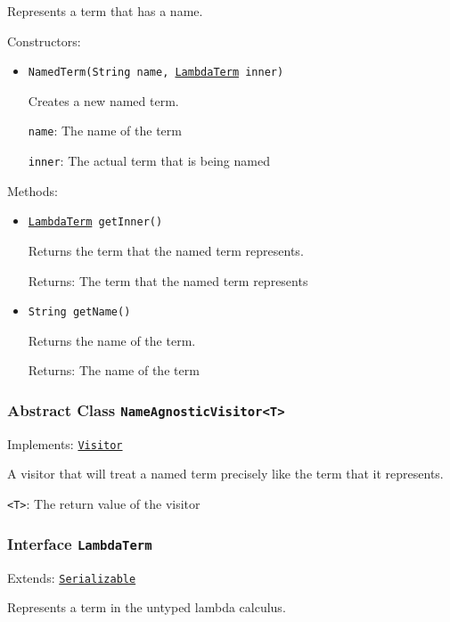 Represents a term that has a name.

Constructors:
\begin{itemize}
\item \texttt{NamedTerm(String name, \hyperref[type:edu.kit.wavelength.client.model.term.LambdaTerm]{LambdaTerm} inner)}

Creates a new named term.

\texttt{name}: The name of the term

\texttt{inner}: The actual term that is being named

\end{itemize}

Methods:
\begin{itemize}
\item \texttt{\hyperref[type:edu.kit.wavelength.client.model.term.LambdaTerm]{LambdaTerm} getInner()}

Returns the term that the named term represents.

Returns: The term that the named term represents

\item \texttt{String getName()}

Returns the name of the term.

Returns: The name of the term

\end{itemize}

\subsubsection{Abstract Class \texttt{NameAgnosticVisitor<T>}}
\label{type:edu.kit.wavelength.client.model.term.NameAgnosticVisitor}
Implements: \texttt{\hyperref[type:edu.kit.wavelength.client.model.term.Visitor]{Visitor}}

A visitor that will treat a named term precisely like the term that
 it represents.

\texttt{<T>}: The return value of the visitor

\subsubsection{Interface \texttt{LambdaTerm}}
\label{type:edu.kit.wavelength.client.model.term.LambdaTerm}
Extends: \texttt{\hyperref[type:edu.kit.wavelength.client.model.serialization.Serializable]{Serializable}}

Represents a term in the untyped lambda calculus.

